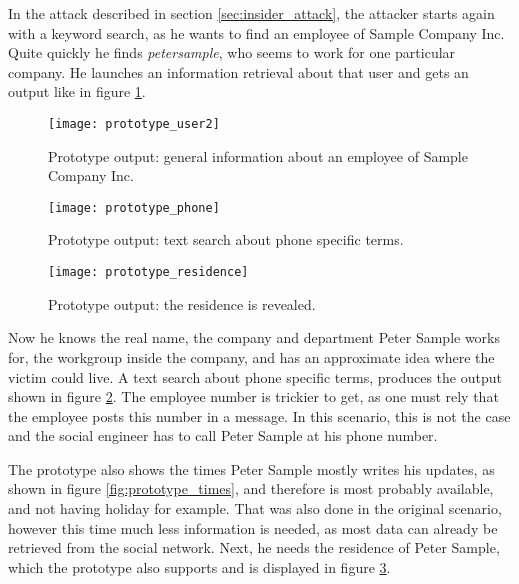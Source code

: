 In the attack described in section \ref{sec:insider_attack}, the attacker
starts again with a keyword search, as he wants to find an employee of Sample
Company Inc. Quite quickly he finds \textit{petersample}, who seems to work for
one particular company. He launches an information retrieval about that user
and gets an output like in figure \ref{fig:prototype_user2}.

\begin{figure}[htb]
  \begin{center}
    \texttt{[image: prototype\_user2]}
    \caption{Prototype output: general information about an employee of Sample Company Inc.}
    \label{fig:prototype_user2}
  \end{center}
\end{figure}

\begin{figure}[htb]
  \begin{center}
    \texttt{[image: prototype\_phone]}
    \caption{Prototype output: text search about phone specific terms.}
    \label{fig:prototype_phone}
  \end{center}
\end{figure}

\begin{figure}[h!tb]
  \begin{center}
    \texttt{[image: prototype\_residence]}
    \caption{Prototype output: the residence is revealed.}
    \label{fig:prototype_residence}
  \end{center}
\end{figure}

Now he knows the real name, the company and department Peter Sample works for,
the workgroup inside the company, and has an approximate idea where the victim
could live. A text search about phone specific terms, produces the output
shown in figure \ref{fig:prototype_phone}. The employee number is
trickier to get, as one must rely that the employee posts this number in a
message. In this scenario, this is not the case and the social engineer has to
call Peter Sample at his phone number.

The prototype also shows the times Peter Sample mostly writes his updates, as
shown in figure \ref{fig:prototype_times}, and therefore is most probably
available, and not having holiday for example. That was also done in the
original scenario, however this time much less information is needed, as most
data can already be retrieved from the social network. Next, he needs the residence
of Peter Sample, which the prototype also supports and is displayed in figure
\ref{fig:prototype_residence}.

